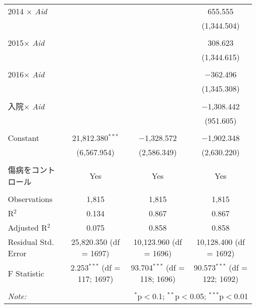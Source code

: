 \documentclass{jsarticle}
\begin{document}
\begin{table}[!htbp]
\begin{tabular}{@{\extracolsep{5pt}}lccc}
 2014 $\times$ \textit{Aid} &  &  & 655.555 \\ 
  &  &  & (1,344.504) \\ 
  & & & \\ 
 2015$\times$ \textit{Aid} &  &  & 308.623 \\ 
  &  &  & (1,344.615) \\ 
  & & & \\ 
 2016$\times$ \textit{Aid} &  &  & $-$362.496 \\ 
  &  &  & (1,345.308) \\ 
  & & & \\ 
 入院$\times$ \textit{Aid} &  &  & $-$1,308.442 \\ 
  &  &  & (951.605) \\ 
  & & & \\ 
 Constant & 21,812.380$^{***}$ & $-$1,328.572 & $-$1,902.348 \\ 
  & (6,567.954) & (2,586.349) & (2,630.220) \\ 
  & & & \\ 
  傷病をコントロール & Yes & Yes & Yes \\
\hline \\[-1.8ex] 
Observations & 1,815 & 1,815 & 1,815 \\ 
R$^{2}$ & 0.134 & 0.867 & 0.867 \\ 
Adjusted R$^{2}$ & 0.075 & 0.858 & 0.858 \\ 
Residual Std. Error & 25,820.350 (df = 1697) & 10,123.960 (df = 1696) & 10,128.400 (df = 1692) \\ 
F Statistic & 2.253$^{***}$ (df = 117; 1697) & 93.704$^{***}$ (df = 118; 1696) & 90.573$^{***}$ (df = 122; 1692) \\ 
\hline 
\hline \\[-1.8ex] 
\textit{Note:}  & \multicolumn{3}{r}{$^{*}$p$<$0.1; $^{**}$p$<$0.05; $^{***}$p$<$0.01} \\ 
\end{tabular} 
\end{table} 
\end{document}
